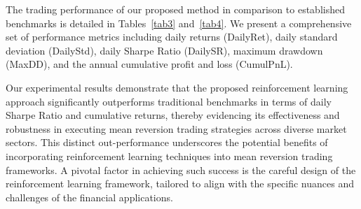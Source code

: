 \documentclass{article}
\begin{document}
The trading performance of our proposed method in comparison to established benchmarks is detailed in Tables~\ref{tab3} and~\ref{tab4}. We present a comprehensive set of performance metrics including daily returns (DailyRet), daily standard deviation (DailyStd), daily Sharpe Ratio (DailySR), maximum drawdown (MaxDD), and the annual cumulative profit and loss (CumulPnL). 


Our experimental results demonstrate that the proposed reinforcement learning approach significantly outperforms traditional benchmarks in terms of daily Sharpe Ratio and cumulative returns, thereby evidencing its effectiveness and robustness in executing mean reversion trading strategies across diverse market sectors. This distinct out-performance underscores the potential benefits of incorporating reinforcement learning techniques into mean reversion trading frameworks. A pivotal factor in achieving such success is the careful design of the reinforcement learning framework, tailored to align with the specific nuances and challenges of the financial applications.
\end{document}
